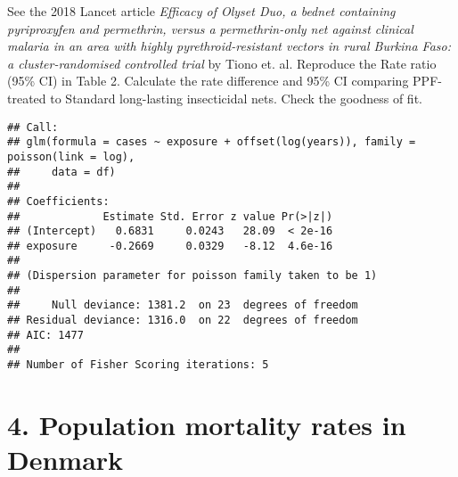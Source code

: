 \documentclass[10pt]{beamer}\usepackage[]{graphicx}\usepackage[]{color}
\makeatletter
\newenvironment{kframe}{%
 \def\at@end@of@kframe{}%
 \ifinner\ifhmode%
  \def\at@end@of@kframe{\end{minipage}}%
  \begin{minipage}{\columnwidth}%
 \fi\fi%
 \def\FrameCommand##1{\hskip\@totalleftmargin \hskip-\fboxsep
 \colorbox{shadecolor}{##1}\hskip-\fboxsep
     \hskip-\linewidth \hskip-\@totalleftmargin \hskip\columnwidth}%
 \MakeFramed {\advance\hsize-\width
   \@totalleftmargin\z@ \linewidth\hsize
   \@setminipage}}%
 {\par\unskip\endMakeFramed%
 \at@end@of@kframe}
\newenvironment{knitrout}{}{} %
\makeatother
\begin{document}
\begin{frame}
		\vspace*{-1.091in}
\tiny
See the 2018 Lancet article \textit{Efficacy of Olyset Duo, a bednet containing pyriproxyfen and permethrin, versus a permethrin-only net against clinical malaria in an area with highly pyrethroid-resistant vectors in rural Burkina Faso: a cluster-randomised controlled trial} by Tiono et. al. Reproduce the Rate ratio (95\% CI) in Table 2. Calculate the rate difference and 95\% CI comparing PPF-treated to Standard long-lasting insecticidal nets. Check the goodness of fit. 




\begin{knitrout}\tiny
{}\color{fgcolor}\begin{kframe}
\begin{verbatim}
## Call:
## glm(formula = cases ~ exposure + offset(log(years)), family = poisson(link = log), 
##     data = df)
## 
## Coefficients:
##             Estimate Std. Error z value Pr(>|z|)
## (Intercept)   0.6831     0.0243   28.09  < 2e-16
## exposure     -0.2669     0.0329   -8.12  4.6e-16
## 
## (Dispersion parameter for poisson family taken to be 1)
## 
##     Null deviance: 1381.2  on 23  degrees of freedom
## Residual deviance: 1316.0  on 22  degrees of freedom
## AIC: 1477
## 
## Number of Fisher Scoring iterations: 5
\end{verbatim}
\end{kframe}
\end{knitrout}

\end{frame}


\section{4. Population mortality rates in Denmark}
\end{document}
